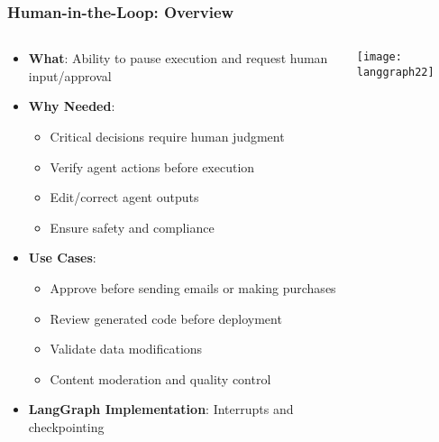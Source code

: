 \begin{frame}[fragile]\frametitle{Human-in-the-Loop: Overview}

\begin{columns}
    \begin{column}[T]{0.6\linewidth}
      \begin{itemize}
        \item \textbf{What}: Ability to pause execution and request human input/approval
        \item \textbf{Why Needed}:
        \begin{itemize}
            \item Critical decisions require human judgment
            \item Verify agent actions before execution
            \item Edit/correct agent outputs
            \item Ensure safety and compliance
        \end{itemize}
        \item \textbf{Use Cases}:
        \begin{itemize}
            \item Approve before sending emails or making purchases
            \item Review generated code before deployment
            \item Validate data modifications
            \item Content moderation and quality control
        \end{itemize}
        \item \textbf{LangGraph Implementation}: Interrupts and checkpointing
      \end{itemize}

    \end{column}
    \begin{column}[T]{0.4\linewidth}
\begin{center}
\texttt{[image: langgraph22]}
\end{center}
    \end{column}
  \end{columns}
  
\end{frame}

